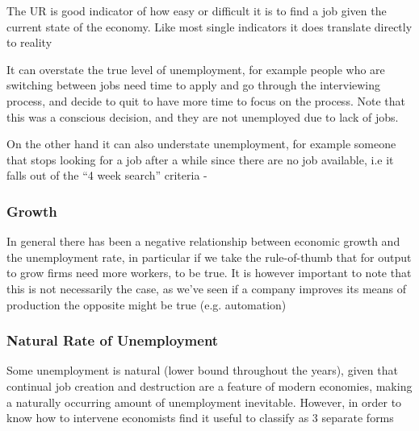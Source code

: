 \documentclass[english,course,draft]{Notes}
\begin{document}
\par{The UR is good indicator of how easy or difficult it is
to find a job given the current state of the economy. Like most single indicators it does translate directly to reality}
\par{It can overstate the true level of unemployment, for example people who are switching between jobs need time to apply and go through the interviewing process, and decide to quit to have more time to focus on the process. Note that this was a conscious decision, and they are not unemployed due to lack of jobs.
\par{ On the other hand it can also understate unemployment, for example someone that stops looking for a job after a while since there are no job available, i.e it falls out of the ``4 week search'' criteria - }



\subsubsection{Growth}

\par{In general there has been a negative relationship between economic growth and the unemployment rate, in particular if we take the rule-of-thumb that for output to grow firms need more workers, to be true. It is however important to note that this is not necessarily the case, as we've seen if a company improves its means of production the opposite might be true (e.g. automation)}


\subsubsection{Natural Rate of Unemployment}

\par{Some unemployment is natural (lower bound throughout the years), given that continual job creation and destruction are a feature of
modern economies, making a naturally occurring amount
of unemployment inevitable. However, in order to know how to intervene economists find it useful to classify as 3 separate forms}

}
\end{document}
